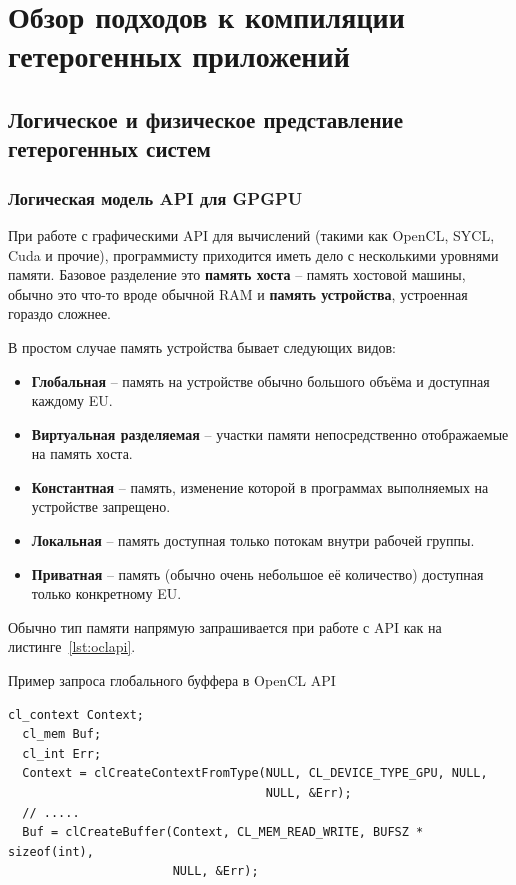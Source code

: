 \chapter{Обзор подходов к компиляции гетерогенных приложений}\label{ch:overview}

\section{Логическое и физическое представление гетерогенных систем}\label{sec:overview/logical}

\subsection{Логическая модель API для GPGPU}\label{subsec:overview/logical/api}

При работе с графическими API для вычислений (такими как OpenCL, SYCL, Cuda и прочие), программисту приходится иметь дело с несколькими уровнями памяти.
Базовое разделение это \textbf{память хоста} -- память хостовой машины, обычно это что-то вроде обычной RAM и \textbf{память устройства}, устроенная гораздо сложнее.

В простом случае память устройства бывает следующих видов:

\begin{itemize}
\item \textbf{Глобальная} -- память на устройстве обычно большого объёма и доступная каждому EU.
\item \textbf{Виртуальная разделяемая} -- участки памяти непосредственно отображаемые на память хоста.
\item \textbf{Константная} -- память, изменение которой в программах выполняемых на устройстве запрещено.
\item \textbf{Локальная} -- память доступная только потокам внутри рабочей группы.
\item \textbf{Приватная} -- память (обычно очень небольшое её количество) доступная только конкретному EU.
\end{itemize}

Обычно тип памяти напрямую запрашивается при работе с API как на листинге~\cref{lst:oclapi}.

\begin{ListingEnv}[!h]
    \captiondelim{ } 
    \caption{Пример запроса глобального буффера в OpenCL API}\label{lst:oclapi}
    \begin{lstlisting}[language={[ISO]C++}]
  cl_context Context;
  cl_mem Buf;
  cl_int Err;
  Context = clCreateContextFromType(NULL, CL_DEVICE_TYPE_GPU, NULL, 
                                    NULL, &Err);
  // .....
  Buf = clCreateBuffer(Context, CL_MEM_READ_WRITE, BUFSZ * sizeof(int), 
                       NULL, &Err);
    \end{lstlisting}
\end{ListingEnv}

